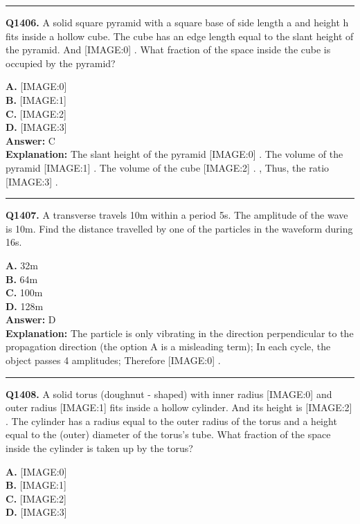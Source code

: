 \documentclass[12pt]{article}
\begin{document}
\hrule
\vspace{1em}


\noindent
\textbf{Q1406.} A solid square pyramid with a square base of side length a
and height h
fits inside a hollow cube. The cube has an edge length equal to the slant height of the pyramid. And
[IMAGE:0]
. What fraction of the space inside the cube is occupied by the pyramid?



\textbf{A.} [IMAGE:0] \\
\textbf{B.} [IMAGE:1] \\
\textbf{C.} [IMAGE:2] \\
\textbf{D.} [IMAGE:3] \\

\textbf{Answer:} C \\
\textbf{Explanation:} The slant height of the pyramid
[IMAGE:0]
. The volume of the pyramid
[IMAGE:1]
. The volume of the cube
[IMAGE:2]
. , Thus, the ratio
[IMAGE:3]
.

\hrule
\vspace{1em}


\noindent
\textbf{Q1407.} A transverse travels 10m within a period 5s. The amplitude of the wave is 10m. Find the distance travelled by one of the particles in the waveform during 16s.



\textbf{A.} 32m \\
\textbf{B.} 64m \\
\textbf{C.} 100m \\
\textbf{D.} 128m \\

\textbf{Answer:} D \\
\textbf{Explanation:} The particle is only vibrating in the direction perpendicular to the propagation direction (the option A is a misleading term); In each cycle, the object passes 4 amplitudes; Therefore
[IMAGE:0]
.

\hrule
\vspace{1em}


\noindent
\textbf{Q1408.} A solid torus (doughnut - shaped) with inner radius
[IMAGE:0]
and outer radius
[IMAGE:1]
fits inside a hollow cylinder. And its height is
[IMAGE:2]
. The cylinder has a radius equal to the outer radius of the torus and a height equal to the (outer) diameter of the torus's tube. What fraction of the space inside the cylinder is taken up by the torus?



\textbf{A.} [IMAGE:0] \\
\textbf{B.} [IMAGE:1] \\
\textbf{C.} [IMAGE:2] \\
\textbf{D.} [IMAGE:3] \\
\end{document}
